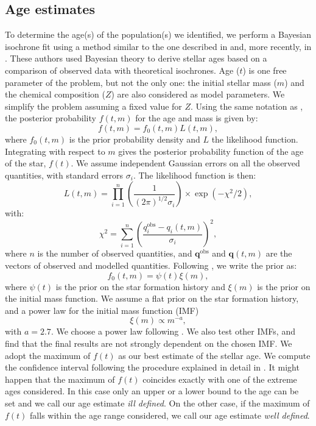 \documentclass[twocolumn]{aa}
\begin{document}
\subsection{Age estimates}\label{sec:3.4}
To determine the age(s) of the population(s) we identified, we perform a Bayesian isochrone fit using a method similar to the one described in \citet{Jorgensen2005} and, more recently, in  \citet{Valls-Gabaud2014}.
\noindent
These authors used Bayesian theory to derive stellar ages based on a comparison of observed data with theoretical isochrones. Age ($t$) is one free parameter of the problem, but not the only one: the initial stellar mass ($m$) and the chemical composition ($Z$) are also considered as model parameters. We simplify the problem assuming a fixed value for $Z$. 
Using the same notation as \citet{Jorgensen2005},  the posterior probability $f(t, m)$ for the age and mass is given by:
\begin{equation}
f(t, m) = f_0(t, m)L(t, m),
\end{equation}
where $f_0(t, m)$ is the prior probability density and $L$ the likelihood function. Integrating with respect to $m$ gives the posterior probability function of the age of the star, $f(t)$.   
We assume independent Gaussian errors on all the observed quantities, with standard errors $\sigma_i$. The likelihood function is then:
\begin{equation*}
L(t, m) = \prod_{i=1}^n \left(\frac{1}{(2\pi)^{1/2}\sigma_i}\right) \times \exp{ \left(- \chi^2/2 \right)},
\end{equation*}
with: 
\begin{equation*}
\chi^2 = \sum_{i = 1}^n \left(\frac{q_i^{\mathrm{obs}}-q_i(t, m)}{\sigma_i}\right)^2,
\end{equation*}
where $n$ is the number of observed quantities, and $\mathbf{q}^{\mathrm{obs}}$ and $\mathbf{q}(t, m)$ are the vectors of observed and modelled quantities.
Following \cite{Jorgensen2005}, we write the prior as:
\begin{equation*}
f_0(t, m) = \psi(t)\xi(m),
\end{equation*}
where $\psi(t)$ is the prior on the star formation history and $\xi(m)$ is the prior on the initial mass function. We assume a flat prior on the star formation history, and a power law for the initial mass function (IMF)
\begin{equation*}
\xi(m) \propto m^{-a},
\end{equation*}
with $a = 2.7$. We choose a power law following \cite{Jorgensen2005}. We also test other IMFs, and find that the final results are not strongly dependent on the chosen IMF.
We adopt the maximum of $f(t)$ as our best estimate of the stellar age. We compute the confidence interval following the procedure explained in detail in \cite{Jorgensen2005}. It might happen that the maximum of $f(t)$ coincides exactly with one of the extreme ages considered. In this case only an upper or a lower bound to the age can be set and we call our age estimate \textit{ill defined}. On the other case, if the maximum of $f(t)$ falls within the age range considered, we call our age estimate \textit{well defined}.
\end{document}

